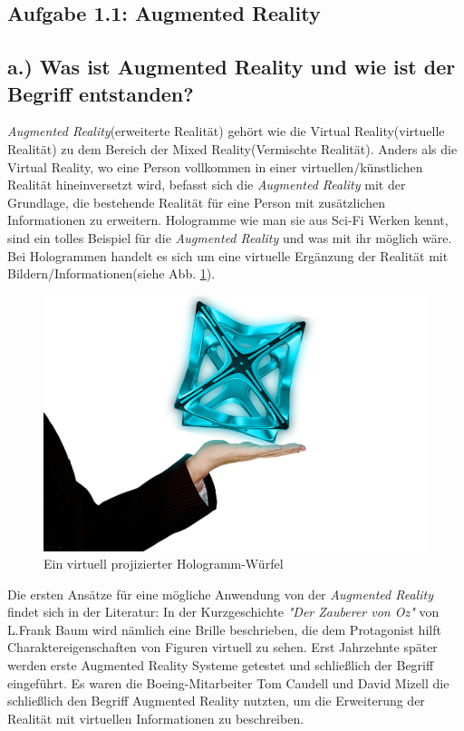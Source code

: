 \documentclass[12pt,utf8]{scrartcl}
\begin{document}
\thispagestyle{empty}
\tableofcontents
\newpage
\begin{flushleft}
\setcounter{page}{1}


\section{\label{sec:thema}Aufgabe 1.1: Augmented Reality}
\subsection{\label{sub:thema}a.) Was ist Augmented Reality und wie ist der Begriff entstanden?}

\textit{Augmented Reality}(erweiterte Realität) gehört wie die Virtual Reality(virtuelle Realität) zu dem Bereich der Mixed Reality(Vermischte Realität). Anders als die Virtual Reality, wo eine Person vollkommen in einer virtuellen/künstlichen Realität hineinversetzt wird, befasst sich die \textit{Augmented Reality} mit der Grundlage, die bestehende Realität für eine Person mit zusätzlichen Informationen zu erweitern.\cite{PaulMilgram} Hologramme wie man sie aus Sci-Fi Werken kennt, sind ein tolles Beispiel für die \textit{Augmented Reality} und was mit ihr möglich wäre. Bei Hologrammen handelt es sich um eine virtuelle Ergänzung der Realität mit Bildern/Informationen(siehe Abb. \ref{fig:hologram}). 
\linebreak

\begin{figure}[H]
	\centering
	\includegraphics[width=0.8\linewidth]{images/hologram}
	\caption{Ein virtuell projizierter Hologramm-Würfel\cite{online4}}
	\label{fig:hologram}
\end{figure}


Die ersten Ansätze für eine mögliche Anwendung von der \textit{Augmented Reality} findet sich in der Literatur: In der Kurzgeschichte \textit{"Der Zauberer von Oz"} von L.Frank Baum wird nämlich eine Brille beschrieben, die dem Protagonist hilft Charaktereigenschaften von Figuren virtuell zu sehen.\cite{onlineAR} Erst Jahrzehnte später werden erste Augmented Reality Systeme getestet und schließlich der Begriff eingeführt. Es waren die Boeing-Mitarbeiter Tom Caudell und David Mizell die schließlich den Begriff Augmented Reality nutzten, um die Erweiterung der Realität mit virtuellen Informationen zu beschreiben.\cite{TomDavid}



\end{flushleft}
\end{document}
